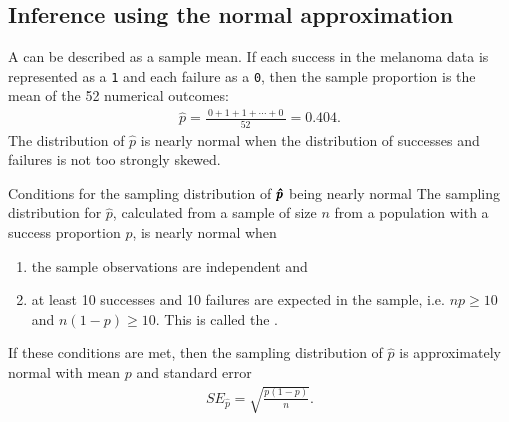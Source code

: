 \subsection{Inference using the normal approximation}

A  can be described as a sample mean. If each success in the melanoma data  is represented as a \texttt{1} and each failure as a \texttt{0}, then the sample proportion is the mean of the 52 numerical outcomes:
\begin{eqnarray*}
\hat{p} = \frac{\ 0 + 1 + 1 + \cdots + 0\ }{52} = 0.404.
\end{eqnarray*}
The distribution of $\hat{p}$ is nearly normal when the distribution of successes and failures is not too strongly skewed.

\textD{\newpage}


\begin{onebox}{Conditions for the sampling distribution of $\pmb{\hat{\MakeLowercase{p}}}$ being nearly normal}
The sampling distribution for $\hat{p}$, calculated from a sample of size $n$ from a population with a success proportion $p$, is nearly normal when
\begin{enumerate}
\item the sample observations are independent and
\item at least 10 successes and 10 failures are expected in the sample, i.e. $np\geq10$ and $n(1-p)\geq10$. This is called the .
\end{enumerate}
If these conditions are met, then the sampling distribution of $\hat{p}$ is approximately normal with mean $p$ and standard error
\begin{eqnarray}
SE_{\hat{p}} = \sqrt{\frac{p(1-p)}{n}}.
\label{seOfPHat}
\end{eqnarray}
\end{onebox}%

